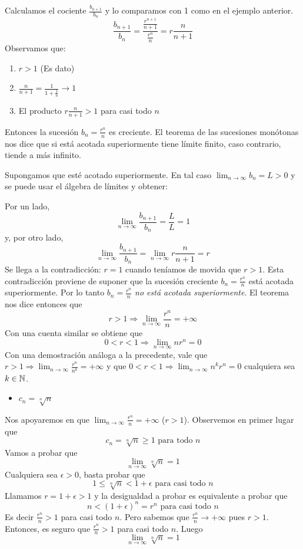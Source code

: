 \documentclass[../teoria.root.tex]{subfiles}
\begin{document}
Calculamos el cociente \(\frac{b_{n+1}}{b_n}\) y lo comparamos con 1 como en el ejemplo anterior.
\[\frac{b_{n+1}}{b_n}=\frac{\frac{r^{n+1}}{n+1}}{\frac{r^n}{n}}=r\frac{n}{n+1}\]
Observamos que:
\begin{enumerate}
    \item \(r>1\) (Es dato)
    \item \(\frac{n}{n+1}=\frac{1}{1+\frac{1}{n}}\rightarrow1\)
    \item El producto \(r\frac{n}{n+1}>1\) para casi todo \(n\)
\end{enumerate}
Entonces la sucesión \(b_n=\frac{r^n}{n}\) es creciente.
El teorema de las sucesiones monótonas nos dice que si está acotada superiormente tiene límite finito, caso contrario, tiende a más infinito.

Supongamos que esté acotado superiormente.
En tal caso \(\lim_{n\to\infty}b_n=L>0\) y se puede usar el álgebra de límites y obtener:

Por un lado, \[\lim_{n\to\infty}\frac{b_{n+1}}{b_n}=\frac{L}{L}=1\]
y, por otro lado, \[\lim_{n\to\infty}\frac{b_{n+1}}{b_n}=\lim_{n\to\infty}r\frac{n}{n+1}=r\]
Se llega a la contradicción: \(r=1\) cuando teníamos de movida que \(r>1\).
Esta contradicción proviene de suponer que la sucesión creciente \(b_n=\frac{r^n}{n}\) está acotada superiormente.
Por lo tanto \(b_n=\frac{r^n}{n}\) \textit{no está acotada superiormente}.
El teorema nos dice entonces que \[r>1\Rightarrow\lim_{n\to\infty}\frac{r^n}{n}=+\infty\]
Con una cuenta similar se obtiene que \[0<r<1\Rightarrow\lim_{n\to\infty}nr^n=0\]
Con una demostración análoga a la precedente, vale que
\(r>1\Rightarrow\lim_{n\to\infty}\frac{r^n}{n^k}=+\infty\) y que \(0<r<1\Rightarrow\lim_{n\to\infty}n^kr^n=0\) cualquiera sea \(k\in\mathbb{N}\).
\begin{itemize}
    \item \(c_n=\sqrt[n]{n}\)
\end{itemize}
Nos apoyaremos en que \(\lim_{n\to\infty}\frac{r^n}{n}=+\infty\) (\(r>1\)).
Observemos en primer lugar que \[c_n=\sqrt[n]{n}\geq1\text{ para todo }n\]
Vamos a probar que \[\lim_{n\to\infty}\sqrt[n]{n}=1\]
Cualquiera sea \(\epsilon>0\), basta probar que \[1\leq\sqrt[n]{n}<1+\epsilon\text{ para casi todo }n\]
Llamamos \(r=1+\epsilon>1\) y la desigualdad a probar es equivalente a probar que \[n<(1+\epsilon)^n=r^n\text{ para casi todo }n\]
Es decir \(\frac{r^n}{n}>1\) para casi todo \(n\).
Pero sabemos que \(\frac{r^n}{n}\rightarrow+\infty\) pues \(r>1\).
Entonces, es seguro que \(\frac{r^n}{n}>1\) para casi todo \(n\).
Luego \[\lim_{n\to\infty}\sqrt[n]{n}=1\]
\end{document}
